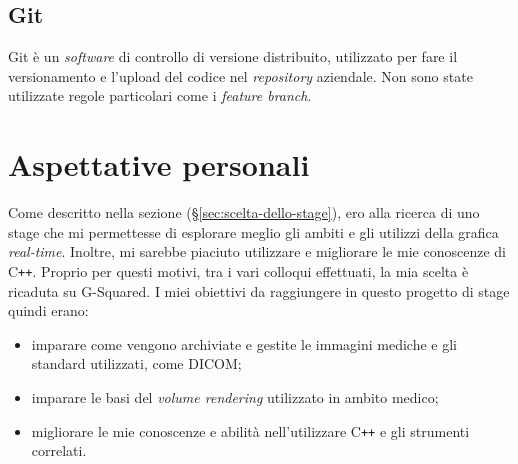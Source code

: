 \subsection{Git}
Git è un \emph{software} di controllo di versione distribuito, utilizzato per fare il versionamento e l'upload del codice nel \emph{repository} aziendale. Non sono state utilizzate regole particolari come i \emph{feature branch}. 



\section{Aspettative personali}
Come descritto nella sezione  (§\ref{sec:scelta-dello-stage}), ero alla ricerca di uno stage che mi permettesse di esplorare meglio gli ambiti e gli utilizzi della grafica \emph{real-time}. Inoltre, mi sarebbe piaciuto utilizzare e migliorare le mie conoscenze di C\texttt{++}. Proprio per questi motivi, tra i vari colloqui effettuati, la mia scelta è ricaduta su G-Squared. I miei obiettivi da raggiungere in questo progetto di stage quindi erano:
\begin{itemize}
\item imparare come vengono archiviate e gestite le immagini mediche e gli standard utilizzati, come DICOM;
\item imparare le basi del \emph{volume rendering} utilizzato in ambito medico;
\item migliorare le mie conoscenze e abilità nell'utilizzare C\texttt{++} e gli strumenti correlati.
\end{itemize}